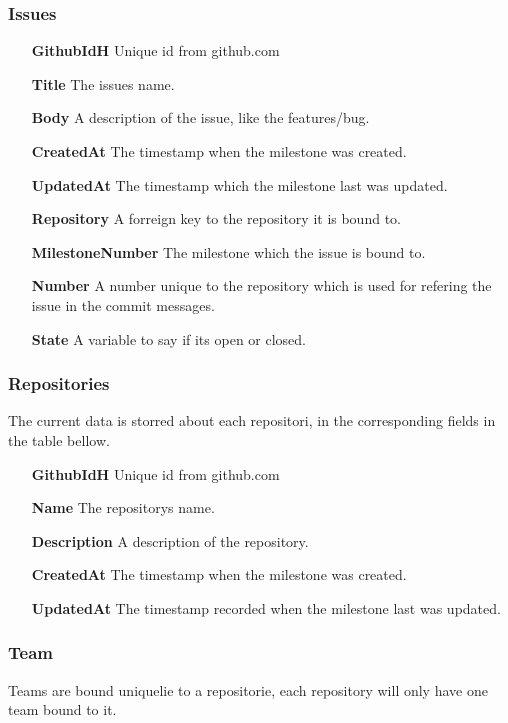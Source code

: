 \subsubsection*{Issues}
\vspace{0.5cm}
\begin{itemize}
    \item[\textbf{GithubIdH}]{Unique id from github.com}
    \item[\textbf{Title}]{The issues name.}
    \item[\textbf{Body}]{A description of the issue, like the features/bug.}
    \item[\textbf{CreatedAt}]{The timestamp when the milestone was created.}
    \item[\textbf{UpdatedAt}]{The timestamp which the milestone last was updated.}
    \item[\textbf{Repository}]{A forreign key to the repository it is bound to.}
    \item[\textbf{MilestoneNumber}]{The milestone which the issue is bound to.}
    \item[\textbf{Number}]{A number unique to the repository which is used for refering the issue in the commit messages.}
    \item[\textbf{State}]{A variable to say if its open or closed.}
\end{itemize}
\vspace{0.5cm}

\subsubsection*{Repositories}
The current data is storred about each repositori, in the corresponding fields in the table bellow.
\vspace{0.5cm}
\begin{itemize}
    \item[\textbf{GithubIdH}]{Unique id from github.com}
    \item[\textbf{Name}]{The repositorys name.}
    \item[\textbf{Description}]{A description of the repository.}
    \item[\textbf{CreatedAt}]{The timestamp when the milestone was created.}
    \item[\textbf{UpdatedAt}]{The timestamp recorded when the milestone last was updated.}
\end{itemize}
\vspace{0.5cm}

\subsubsection{Team}
Teams are bound uniquelie to a repositorie, each repository will only have one team bound to it. %

